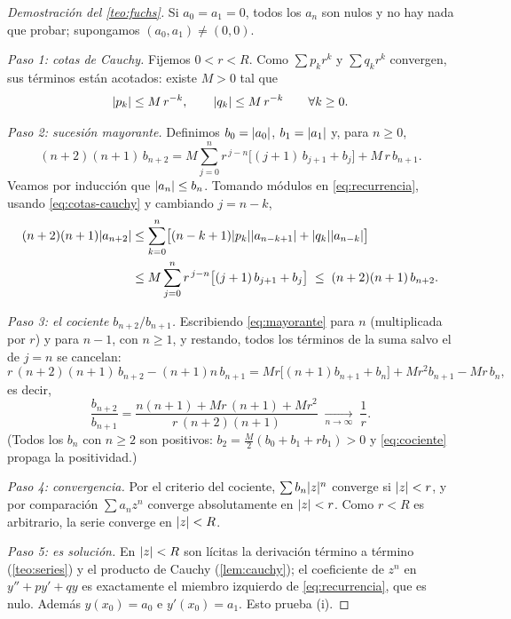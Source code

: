 \begin{proof}[Demostración del \cref{teo:fuchs}]
Si $a_0=a_1=0$, todos los $a_n$ son nulos y no hay nada que probar;
supongamos $(a_0,a_1)\neq(0,0)$.

\emph{Paso 1: cotas de Cauchy.} Fijemos $0<r<R$. Como $\sum p_kr^{k}$ y
$\sum q_kr^{k}$ convergen, sus términos están acotados: existe $M>0$ tal que
\begin{equation}\label{eq:cotas-cauchy}
  \lvert p_k\rvert\le M\,r^{-k},\qquad \lvert q_k\rvert\le M\,r^{-k}\qquad\forall k\ge0 .
\end{equation}

\emph{Paso 2: sucesión mayorante.} Definimos $b_0=\lvert a_0\rvert$,
$b_1=\lvert a_1\rvert$ y, para $n\ge0$,
\begin{equation}\label{eq:mayorante}
  (n+2)(n+1)\,b_{n+2}=M\sum_{j=0}^{n}r^{\,j-n}\bigl[(j+1)\,b_{j+1}+b_j\bigr]+M\,r\,b_{n+1}.
\end{equation}
Veamos por inducción que $\lvert a_n\rvert\le b_n$. Tomando módulos en
\eqref{eq:recurrencia}, usando \eqref{eq:cotas-cauchy} y cambiando
$j=n-k$,
\begin{align*}
  (n+2)(n+1)\lvert a_{n+2}\rvert
  &\le\sum_{k=0}^{n}\bigl[(n-k+1)\lvert p_k\rvert\lvert a_{n-k+1}\rvert+\lvert q_k\rvert\lvert a_{n-k}\rvert\bigr]\\
  &\le M\sum_{j=0}^{n}r^{\,j-n}\bigl[(j+1)\,b_{j+1}+b_j\bigr]
  \;\le\;(n+2)(n+1)\,b_{n+2}.
\end{align*}

\emph{Paso 3: el cociente $b_{n+2}/b_{n+1}$.} Escribiendo
\eqref{eq:mayorante} para $n$ (multiplicada por $r$) y para $n-1$, con
$n\ge1$, y restando, todos los términos de la suma salvo el de $j=n$ se
cancelan:
\[
  r\,(n+2)(n+1)\,b_{n+2}-(n+1)n\,b_{n+1}
  =M r\bigl[(n+1)b_{n+1}+b_n\bigr]+Mr^{2}b_{n+1}-Mr\,b_n ,
\]
es decir,
\begin{equation}\label{eq:cociente}
  \frac{b_{n+2}}{b_{n+1}}
  =\frac{n(n+1)+Mr\,(n+1)+Mr^{2}}{r\,(n+2)(n+1)}
  \;\xrightarrow[n\to\infty]{}\;\frac1r .
\end{equation}
(Todos los $b_n$ con $n\ge2$ son positivos: $b_2=\tfrac M2(b_0+b_1+rb_1)>0$
y \eqref{eq:cociente} propaga la positividad.)

\emph{Paso 4: convergencia.} Por el criterio del cociente,
$\sum b_n\lvert z\rvert^{n}$ converge si $\lvert z\rvert<r$, y por comparación
$\sum a_nz^{n}$ converge absolutamente en $\lvert z\rvert<r$. Como $r<R$ es
arbitrario, la serie converge en $\lvert z\rvert<R$.

\emph{Paso 5: es solución.} En $\lvert z\rvert<R$ son lícitas la derivación término a
término (\cref{teo:series}) y el producto de Cauchy (\cref{lem:cauchy}); el
coeficiente de $z^{n}$ en $y''+py'+qy$ es exactamente el miembro izquierdo de
\eqref{eq:recurrencia}, que es nulo. Además $y(x_0)=a_0$ e $y'(x_0)=a_1$.
Esto prueba (i).


\end{proof}
